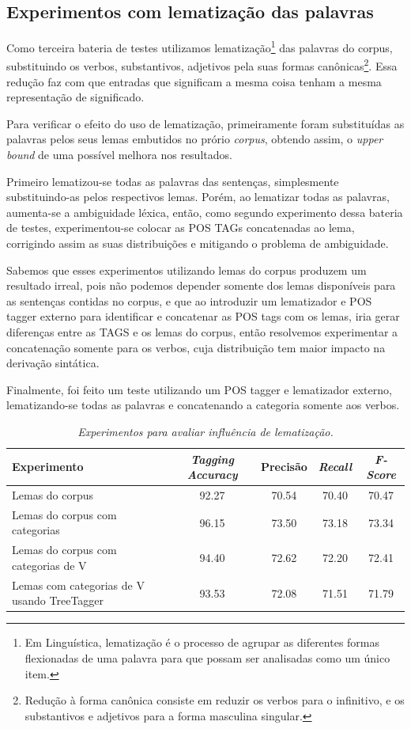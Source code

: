 \subsection{Experimentos com lematização das palavras}
\label{sec:lematizacao}

Como terceira bateria de testes utilizamos lematização\footnote{Em Linguística, lematização é o processo de agrupar as diferentes formas flexionadas de uma palavra para que possam ser analisadas como um único item.} das palavras do corpus, substituindo os verbos,
substantivos, adjetivos pela suas formas canônicas\footnote{Redução à forma canônica consiste em reduzir os verbos para o infinitivo, e os substantivos e adjetivos para a forma masculina singular.}. Essa redução faz com que entradas que significam a mesma coisa tenham a mesma representação de significado.

Para verificar o efeito do uso de lematização, primeiramente foram substituídas as palavras pelos seus lemas embutidos no prório \emph{corpus}, obtendo assim, o \emph{upper bound} de uma possível melhora nos resultados.

Primeiro lematizou-se todas as palavras das sentenças, simplesmente substituindo-as pelos respectivos lemas. Porém, ao lematizar todas as palavras, aumenta-se a ambiguidade léxica, então, como segundo experimento dessa bateria de testes, experimentou-se colocar as POS TAGs concatenadas ao lema, corrigindo assim as suas distribuições e mitigando o problema de ambiguidade. 

Sabemos que esses experimentos utilizando lemas do corpus produzem um resultado irreal, pois não podemos depender somente dos lemas disponíveis para as sentenças contidas no corpus, e que ao introduzir um lematizador e POS tagger externo para identificar e concatenar as POS tags com os lemas, iria gerar diferenças entre as TAGS e os lemas do corpus, então resolvemos experimentar a concatenação somente para os verbos, cuja distribuição tem maior impacto na derivação sintática.

Finalmente, foi feito um teste utilizando um POS tagger e lematizador externo, lematizando-se todas as palavras e concatenando a categoria somente aos verbos.


\begin{table}[H]
\centering
\footnotesize
\caption{\it Experimentos para avaliar influência de lematização.}
	\begin{tabular}{|l|c|c|c|c|}
		\hline
		\textbf{Experimento} &  \textbf{\emph{Tagging Accuracy}} & \textbf{Precisão} & \textbf{\emph{Recall}} & \textbf{\emph{F-Score}} \\
		\hline
		Lemas do corpus & 92.27 & 70.54 & 70.40 & 70.47\\
		\hline		
		Lemas do corpus com categorias & 96.15 & 73.50 & 73.18 & 73.34\\
		\hline		
		Lemas do corpus com categorias de V & 94.40 & 72.62 & 72.20 & 72.41\\
		\hline		
		Lemas com categorias de V usando TreeTagger & 93.53 & 72.08 & 71.51 & 71.79\\
		\hline
	\end{tabular}
	\label{tab:terceiro_experimento}
\end{table}

